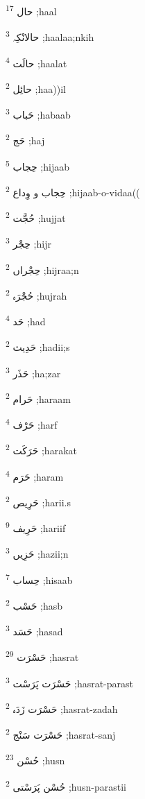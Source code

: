 \documentclass[12pt]{article}
\begin{document}
\begin{RTL}
\begin{multicols}{5}
{\ur حال}   \textsuperscript{17} ;haal

{\ur حالانْکِہ}   \textsuperscript{3} ;haalaa;nkih

{\ur حالَت}   \textsuperscript{4} ;haalat

{\ur حائِل}   \textsuperscript{2} ;haa))il

{\ur حَباب}   \textsuperscript{3} ;habaab

{\ur حَج}   \textsuperscript{2} ;haj

{\ur حِجاب}   \textsuperscript{5} ;hijaab

{\ur حِجاب و وِداع}   \textsuperscript{2} ;hijaab-o-vidaa((

{\ur حُجَّت}   \textsuperscript{2} ;hujjat

{\ur حِجْر}   \textsuperscript{3} ;hijr

{\ur حِجْراں}   \textsuperscript{2} ;hijraa;n

{\ur حُجْرَہ}   \textsuperscript{2} ;hujrah

{\ur حَد}   \textsuperscript{4} ;had

{\ur حَدِیث}   \textsuperscript{2} ;hadii;s

{\ur حَذَر}   \textsuperscript{3} ;ha;zar

{\ur حَرام}   \textsuperscript{2} ;haraam

{\ur حَرْف}   \textsuperscript{4} ;harf

{\ur حَرَکَت}   \textsuperscript{2} ;harakat

{\ur حَرَم}   \textsuperscript{4} ;haram

{\ur حَرِیص}   \textsuperscript{2} ;harii.s

{\ur حَرِیف}   \textsuperscript{9} ;hariif

{\ur حَزِیں}   \textsuperscript{3} ;hazii;n

{\ur حِساب}   \textsuperscript{7} ;hisaab

{\ur حَسْب}   \textsuperscript{2} ;hasb

{\ur حَسَد}   \textsuperscript{3} ;hasad

{\ur حَسْرَت}   \textsuperscript{29} ;hasrat

{\ur حَسْرَت پَرَسْت}   \textsuperscript{3} ;hasrat-parast

{\ur حَسْرَت زَدَہ}   \textsuperscript{2} ;hasrat-zadah

{\ur حَسْرَت سَنْج}   \textsuperscript{2} ;hasrat-sanj

{\ur حُسْن}   \textsuperscript{23} ;husn

{\ur حُسْن پَرَسْتی}   \textsuperscript{2} ;husn-parastii


\end{multicols}
\end{RTL}
\end{document}
